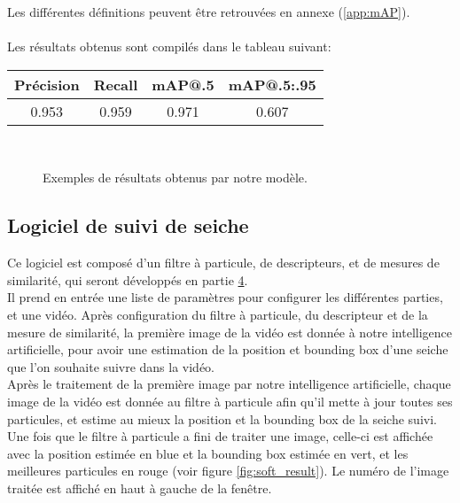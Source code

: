 Les différentes définitions peuvent être retrouvées en annexe (\ref{app:mAP}).\\
\\
Les résultats obtenus sont compilés dans le tableau suivant:\\
\begin{center}
\begin{tabular}{|c|c|c|c|}
	\hline
	Précision & Recall & mAP@.5 & mAP@.5:.95\\
	\hline
	0.953 & 0.959 & 0.971 & 0.607\\
	\hline
\end{tabular}
\end{center}

\begin{figure}[!htbp]
\center
	\hspace{0.1cm}
	\\
	\hspace{0.1cm}
\caption{Exemples de résultats obtenus par notre modèle.}
\label{fig:ai_examples}
\end{figure}
\FloatBarrier



\subsection{Logiciel de suivi de seiche}
Ce logiciel est composé d'un filtre à particule, de descripteurs, et de mesures de similarité, qui seront développés en partie \hyperlink{chapter.4}{4}.\\
Il prend en entrée une liste de paramètres pour configurer les différentes parties, et une vidéo. Après configuration du filtre à particule, du descripteur et de la mesure de similarité, la première image de la vidéo est donnée à notre intelligence artificielle, pour avoir une estimation de la position et bounding box d'une seiche que l'on souhaite suivre dans la vidéo.\\
Après le traitement de la première image par notre intelligence artificielle, chaque image de la vidéo est donnée au filtre à particule afin qu'il mette à jour toutes ses particules, et estime au mieux la position et la bounding box de la seiche suivi.\\
Une fois que le filtre à particule a fini de traiter une image, celle-ci est affichée avec la position estimée en blue et la bounding box estimée en vert, et les meilleures particules en rouge (voir figure \ref{fig:soft_result}). Le numéro de l'image traitée est affiché en haut à gauche de la fenêtre.\\

